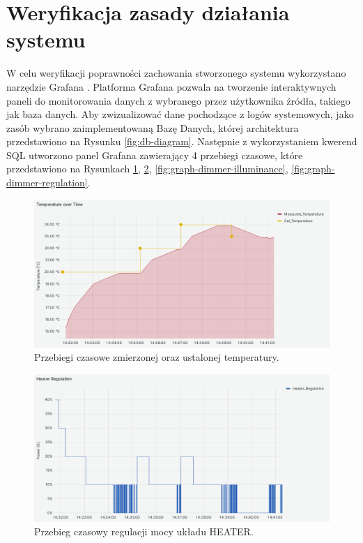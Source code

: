 \section{Weryfikacja zasady działania systemu}

W celu weryfikacji poprawności zachowania stworzonego systemu wykorzystano narzędzie Grafana \cite{grafana}. Platforma Grafana pozwala na tworzenie interaktywnych paneli do monitorowania danych z wybranego przez użytkownika źródła, takiego jak baza danych. Aby zwizualizować dane pochodzące z logów systemowych, jako zasób wybrano zaimplementowaną Bazę Danych, której architektura przedstawiono na Rysunku \ref{fig:db-diagram}. Następnie z wykorzystaniem kwerend SQL utworzono panel Grafana zawierający 4 przebiegi czasowe, które przedstawiono na Rysunkach \ref{fig:graph-heater-temperature}, \ref{fig:graph-heater-regulation}, \ref{fig:graph-dimmer-illuminance},  \ref{fig:graph-dimmer-regulation}.
    
\begin{figure}[H]
    \centering
    \includegraphics[width=0.8\linewidth]{graphics/grafana/temperature-lm.png}
    \caption{Przebiegi czasowe zmierzonej oraz ustalonej temperatury.}
    \label{fig:graph-heater-temperature}
\end{figure}

\begin{figure}[H]
    \centering
    \includegraphics[width=0.8\linewidth]{graphics/grafana/heater-regulation-lm.png}
    \caption{Przebieg czasowy regulacji mocy układu HEATER.}
    \label{fig:graph-heater-regulation}
\end{figure}


